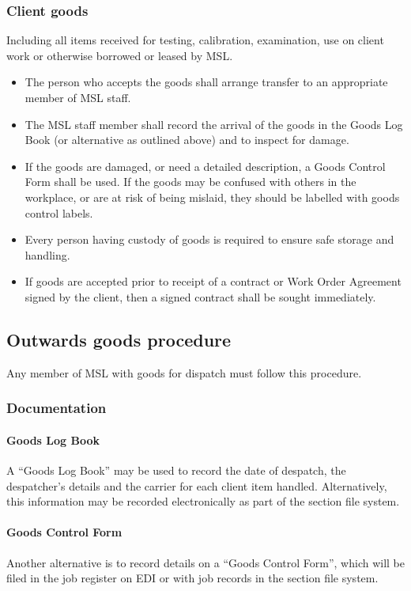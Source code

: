 \subsubsection{Client goods}
Including all items received for testing, calibration, examination, use on client work or otherwise borrowed or leased by MSL. 
\begin{itemize}
\item The person who accepts the goods shall arrange transfer to an appropriate member of MSL staff.
\item The MSL staff member shall record the arrival of the goods in the Goods Log Book (or alternative as outlined above) and to inspect for damage.
\item If the goods are damaged, or need a detailed description, a Goods Control Form shall be used. If the goods may be confused with others in the workplace, or are at risk of being mislaid, they should be labelled with goods control labels. 
\item Every person having custody of goods is required to ensure safe storage and handling. 
\item If goods are accepted prior to receipt of a contract or Work Order Agreement signed by the client, then a signed contract shall be sought immediately.
\end{itemize} 

\subsection{Outwards goods procedure}
Any member of MSL with goods for dispatch must follow this procedure.

\subsubsection{Documentation}
\paragraph{Goods Log Book}
A ``Goods Log Book'' may be used to record the date of despatch, the despatcher's details and the carrier for each client item handled. Alternatively, this information may be recorded electronically as part of the section file system.

\paragraph{Goods Control Form}
Another alternative is to record details on a ``Goods Control Form'', which will be filed in the job register on EDI or with job records in the section file system.

